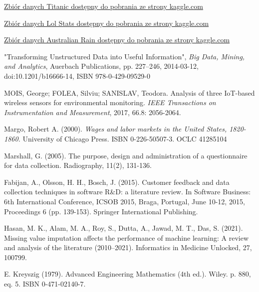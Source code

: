 \documentclass[oneside]{book}
\begin{document}
\begin{thebibliography}{9}
    
    \href{https://www.kaggle.com/competitions/titanic/data?select=train.csv}{Zbiór danych Titanic dostępny do pobrania ze strony kaggle.com}
    
    \href{https://www.kaggle.com/datasets/vivovinco/league-of-legends-stats-s13}{Zbiór danych Lol Stats dostępny do pobrania ze strony kaggle.com}
    
    \href{https://www.kaggle.com/datasets/jsphyg/weather-dataset-rattle-package}{Zbiór danych Australian Rain dostępny do pobrania ze strony kaggle.com}
    
    "Transforming Unstructured Data into Useful Information", \emph{Big Data, Mining, and Analytics}, Auerbach Publications, pp. 227–246, 2014-03-12, doi:10.1201/b16666-14, ISBN 978-0-429-09529-0

    MOIS, George; FOLEA, Silviu; SANISLAV, Teodora. Analysis of three IoT-based wireless sensors for environmental monitoring. \emph{IEEE Transactions on Instrumentation and Measurement}, 2017, 66.8: 2056-2064.
    
    Margo, Robert A. (2000). \emph{Wages and labor markets in the United States, 1820-1860.} University of Chicago Press. ISBN 0-226-50507-3. OCLC 41285104

    Marshall, G. (2005). The purpose, design and administration of a questionnaire for data collection. Radiography, 11(2), 131-136.

    Fabijan, A., Olsson, H. H., Bosch, J. (2015). Customer feedback and data collection techniques in software R\&D: a literature review. In Software Business: 6th International Conference, ICSOB 2015, Braga, Portugal, June 10-12, 2015, Proceedings 6 (pp. 139-153). Springer International Publishing.

    Hasan, M. K., Alam, M. A., Roy, S., Dutta, A., Jawad, M. T.,  Das, S. (2021). Missing value imputation affects the performance of machine learning: A review and analysis of the literature (2010–2021). Informatics in Medicine Unlocked, 27, 100799.

    E. Kreyszig (1979). Advanced Engineering Mathematics (4th ed.). Wiley. p. 880, eq. 5. ISBN 0-471-02140-7.


\end{thebibliography}
\end{document}
